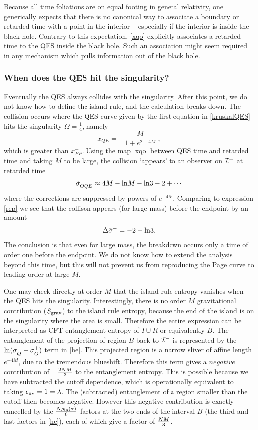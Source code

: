 \documentclass[11pt,oneside,letterpaper]{article}
\newcommand{\be}{\begin{equation}}
\newcommand{\ee}{\end{equation}}
\def\be{\begin{eqnarray}}
\def\ee{\end{eqnarray}}
\let\s=\sigma \let\t=\tau \let\u=\upsilon \let\c=\chi
\def\be{\begin{equation}}
\def\ee{\end{equation}}
\def\m{{M}}
\def\euv{\epsilon_{\rm uv}}
\def\log{{\rm ln}}
\numberwithin{equation}{section}
\def \be {\begin{equation}}
\def \ee {\end{equation}}
\begin{document}
Because all time foliations are on equal footing in general relativity, one generically expects that there is no canonical way to associate a boundary or retarded time with a point in the interior  --  especially if the interior is inside the black hole.  Contrary to this expectation, \eqref{xqo} explicitly associates a retarded time to the QES inside the black hole. Such an association might  seem required in any mechanism which pulls information out of the black hole. 







\subsubsection{When does the QES hit the singularity?}

Eventually the QES always collides with  the singularity. After this point, we do not know how to define the island rule, and the calculation breaks down. The collision  occurs where the QES curve given by the first equation in \eqref{kruskalQES} hits the singularity $\Omega = \frac{1}{4}$, namely
\be
x^-_{QE} = - \frac{\m }{1 + e^{2-4\m }} \ ,
\ee
which is greater than $x^-_{EP}$.
Using the  map \eqref{xqo} between QES time and retarded time and taking $\m$ to be large, the collision `appears' to an observer on ${\cal I}^+$
at retarded time 
\be
\tilde\s_{OQE}^- \approx 
4\m-\log \m -\log 3 -2 +\cdots
\ee 
where the corrections are suppressed by powers of $e^{-4\m}$. Comparing to expression \eqref{rep} we see that the collison appears (for large mass) before 
 the endpoint by an amount
 \be \Delta \tilde \s^-=-2-\log 3. \ee
 The conclusion is that even for large mass, the breakdown occurs only a time of order one before the endpoint. We do not know how to extend the analysis beyond this time, but this will not prevent us from reproducing the Page curve to leading order at large $\m$.
 
 
 
 
 One may check directly at order $\m$ that the island rule entropy vanishes when the QES hits the singularity.  Interestingly, there is no order $\m$ gravitational contribution ($S_{\rm grav}$) to the island rule entropy, because the end of the island is on the singularity where the area is small.  Therefore the entire expression can be interpreted as CFT entanglement entropy of $I\cup R$ or equivalently $B$. The entanglement of the projection of region $B$ back to ${\cal I}^-$ is represented by the $\log (\s^+_{\bar Q}  - \s^+_{\bar O})$ term in \eqref{he}. This projected region is a narrow sliver of affine length $e^{-4M}$, due to the tremendous blueshift. Therefore this term gives a $negative$ contribution of $-{2N\m \over 3}$ to the entanglement entropy. This is possible because we have subtracted the cutoff dependence, which is operationally equivalent to taking $\euv=1=\lambda$. The (subtracted) entanglement of a region smaller than the cutoff then becomes negative. However this negative contribution is exactly cancelled by the $N\rho_{\text{in}}(\s) \over 6 $ factors at the two ends of the interval $B$ (the third and last factors in \eqref{he}), each of which give a factor of $N\m \over 3$. 
 
\end{document}
